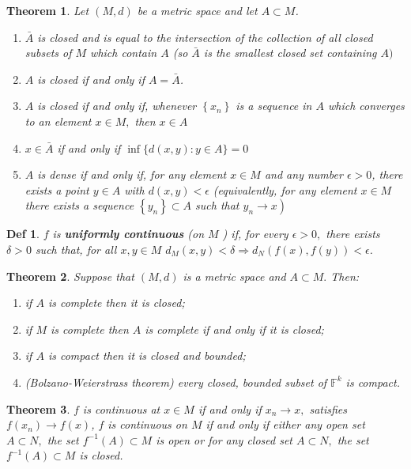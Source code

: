 \documentclass[10pt]{paper}
\newtheorem{theorem}{Theorem}[section]
\newtheorem{definition}{Def}[section]
\begin{document}
\begin{theorem}
    Let $(M, d)$ be a metric space and let $A \subset M$.
    \begin{enumerate}
        \item $\bar{A}$ is closed and is equal to the intersection of the collection of all closed subsets of $M$ which contain $A$ (so $\bar{A}$ is the smallest closed set containing
              $A)$
        \item $A$ is closed if and only if $A=\bar{A}$.
        \item $A$ is closed if and only if, whenever $\left\{x_{n}\right\}$ is a sequence in $A$ which converges to an element $x \in M,$ then $x \in A$
        \item $x \in \bar{A}$ if and only if $\inf \{d(x, y): y \in A\}=0$
        \item $A$ is dense if and only if, for any element $x \in M$ and any number $\epsilon>0$, there exists a point $y \in A$ with $d(x, y)<\epsilon$ (equivalently, for any element $x \in M$ there exists a sequence $\left\{y_{n}\right\} \subset A$ such that $\left.y_{n} \rightarrow x\right)$
    \end{enumerate}
\end{theorem}

\begin{definition}
    $f$ is \textbf{uniformly continuous} (on $M$ ) if, for every $\epsilon>0,$ there exists $\delta>0$ such that, for all $x, y \in M$ $d_{M}(x, y)<\delta \Rightarrow d_{N}(f(x), f(y))<\epsilon$.
\end{definition}



\begin{theorem}
    Suppose that $(M, d)$ is a metric space and $A \subset M .$ Then:
    \begin{enumerate}
        \item if $A$ is complete then it is closed;
        \item if $M$ is complete then $A$ is complete if and only if it is closed;
        \item if $A$ is compact then it is closed and bounded;
        \item (Bolzano-Weierstrass theorem) every closed, bounded subset of $\mathbb{F}^{k}$ is compact.
    \end{enumerate}
\end{theorem}

\begin{theorem}
    $f$ is continuous at $x \in M$ if and only if $x_{n} \rightarrow x,$ satisfies $f\left(x_{n}\right) \rightarrow f(x)$, $f$ is continuous on $M$ if and only if either any open set $A \subset N,$ the set $f^{-1}(A) \subset M$ is open or for any closed set $A \subset N,$ the set $f^{-1}(A) \subset M$ is closed.
\end{theorem}
\end{document}
